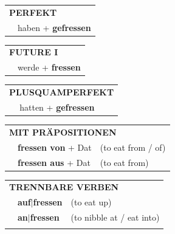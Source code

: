 \documentclass[10pt,a4paper]{revtex4-2}
\begin{document}
\begin{verbbox}
    \vspace{10pt}

 \begin{tabular}{rl}
     \multicolumn{2}{l}{\textbf{PERFEKT}}\\
   & haben + \textbf{gefressen}\\
  \end{tabular}
\hfill
   \begin{tabular}{rl}
    \multicolumn{2}{l}{\textbf{FUTURE I} }\\
   & werde + \textbf{fressen}\\
  \end{tabular}
\hfill
   \begin{tabular}{rl}
      \multicolumn{2}{l}{\textbf{PLUSQUAMPERFEKT}}\\
   & hatten + \textbf{gefressen}\\
  \end{tabular}

   \vspace{10pt}

   \begin{tabular}{lll}
      \multicolumn{3}{l}{\textbf{MIT PRÄPOSITIONEN}}\\
& \textbf{fressen von} + Dat & (to eat from / of)\\
& \textbf{fressen aus} + Dat & (to eat from)\\
\end{tabular}
  \hfill
   \begin{tabular}{lll}
      \multicolumn{3}{l}{\textbf{TRENNBARE VERBEN}}\\
 & \textbf{auf$|$fressen} & (to eat up)\\
 & \textbf{an$|$fressen} & (to nibble at / eat into)\\
\vspace{10pt}
  \end{tabular}

  \vspace{-5pt}

\end{verbbox}
\end{document}
